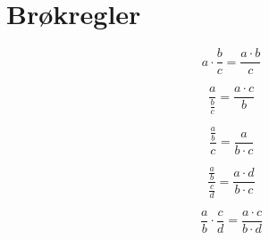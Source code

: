 \section{Brøkregler}
\[a\cdot \frac{b}{c}=\frac{a\cdot b}{c}\]

\[\frac{a}{\frac{b}{c}}=\frac{a\cdot c}{b}\]

\[\frac{\frac{a}{b}}{c}=\frac{a}{b\cdot c}\]

\[\frac{\frac{a}{b}}{\frac{c}{d}}=\frac{a\cdot d}{b\cdot c}\]

\[\frac{a}{b}\cdot \frac{c}{d}=\frac{a\cdot c}{b\cdot d}\]
